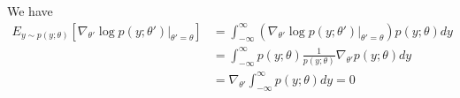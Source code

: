 \begin{answer}
We have
    $$
    \begin{aligned}
        E_{y\sim p(y;\theta)}[\nabla_{\theta'}\log p(y;\theta')|_{\theta' = \theta}] &= \int_{-\infty}^{\infty}(\nabla_{\theta'}\log p(y;\theta')|_{\theta' = \theta}) p(y;\theta)dy \\
        &= \int_{-\infty}^{\infty}p(y;\theta)\frac{1}{p(y;\theta)} \nabla_{\theta'} p(y;\theta)dy\\
        &= \nabla_{\theta'} \int_{-\infty}^{\infty}p(y;\theta)dy = 0
    \end{aligned}
    $$

\end{answer}
